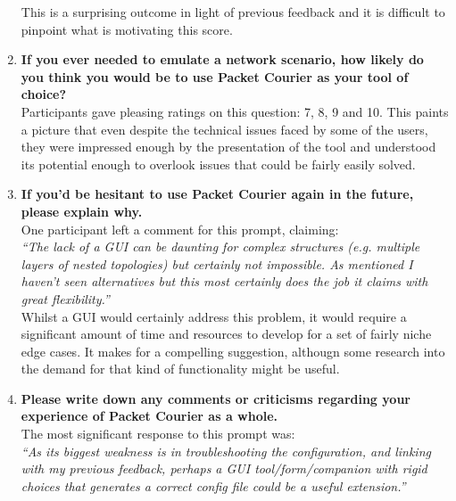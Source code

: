 \begin{enumerate}
    This is a surprising outcome in light of previous feedback and it is difficult to pinpoint what is motivating
    this score.
    \item \textbf{If you ever needed to emulate a network scenario, how likely do you think you would be to use
    Packet Courier as your tool of choice?} \\
    Participants gave pleasing ratings on this question: 7, 8, 9 and 10. This paints a picture that even despite the
    technical issues faced by some of the users, they were impressed enough by the presentation of the tool and
    understood its potential enough to overlook issues that could be fairly easily solved.
    \item \textbf{If you'd be hesitant to use Packet Courier again in the future, please explain why.} \\
    One participant left a comment for this prompt, claiming: \\
    \emph{``The lack of a GUI can be daunting for complex structures (e.g. multiple layers of nested topologies) but
    certainly not impossible. As mentioned I haven't seen alternatives but this most certainly does the job it claims
    with great flexibility.''} \\
    Whilst a GUI would certainly address this problem, it would require a significant amount of time and resources to
    develop for a set of fairly niche edge cases. It makes for a compelling suggestion, althougn some research into
    the demand for that kind of functionality might be useful.
    \item \textbf{Please write down any comments or criticisms regarding your experience of Packet Courier as a
    whole.} \\
    The most significant response to this prompt was: \\
    \emph{``As its biggest weakness is in troubleshooting the configuration, and linking with my previous feedback,
        perhaps a GUI tool/form/companion with rigid choices that generates a correct config file could be a useful
        extension.''}
\end{enumerate}

